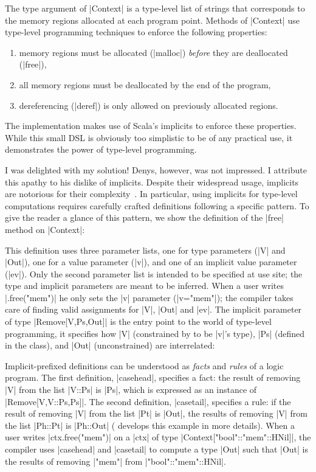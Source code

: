 \memImplicitMain

\noindent
The type argument of |Context| is a type-level list of strings that corresponds to the memory regions allocated at each program point.
Methods of |Context| use type-level programming techniques to enforce the following properties:

\begin{enumerate}
  \item memory regions must be allocated (|malloc|) \emph{before} they are deallocated (|free|),
  \item all memory regions must be deallocated by the end of the program,
  \item dereferencing (|deref|) is only allowed on previously allocated regions.
\end{enumerate}

\noindent
The implementation makes use of Scala's implicits to enforce these properties.
While this small DSL is obviously too simplistic to be of any practical use, it demonstrates the power of type-level programming.

I was delighted with my solution!
Denys, however, was not impressed.
I attribute this apathy to his dislike of implicits.
Despite their widespread usage, implicits are notorious for their complexity~\citep{kvrikava2019scala}.
In particular, using implicits for type-level computations requires carefully crafted definitions following a specific pattern.
To give the reader a glance of this pattern, we show the definition of the |free| method on |Context|:

\memImplicitContextFree

\noindent
This definition uses three parameter lists, one for type parameters (|V| and |Out|), one for a value parameter (|v|), and one of an implicit value parameter (|ev|).
Only the second parameter list is intended to be specified at use site; the type and implicit parameters are meant to be inferred.
When a user writes |.free("mem")| he only sets the |v| parameter (|v="mem"|); the compiler takes care of finding valid assignments for |V|, |Out| and |ev|.
The implicit parameter of type |Remove[V,Ps,Out]| is the entry point to the world of type-level programming, it specifies how |V| (constrained by to be |v|'s type), |Ps| (defined in the class), and |Out| (unconstrained) are interrelated:

\memImplicitRemove

\noindent
Implicit-prefixed definitions can be understood as \emph{facts} and \emph{rules} of a logic program.
The first definition, |casehead|, specifies a fact: the result of removing |V| from the list |V::Ps| is |Ps|, which is expressed as an instance of |Remove[V,V::Ps,Ps]|.
The second definition, |casetail|, specifies a rule: if the result of removing |V| from the list |Pt| is |Out|, the results of removing |V| from the list |Ph::Pt| is |Ph::Out| ( develops this example in more details).
When a user writes |ctx.free("mem")| on a |ctx| of type |Context["bool"::"mem"::HNil]|, the compiler uses |casehead| and |casetail| to compute a type |Out| such that |Out| is the results of removing |"mem"| from |"bool"::"mem"::HNil|.

